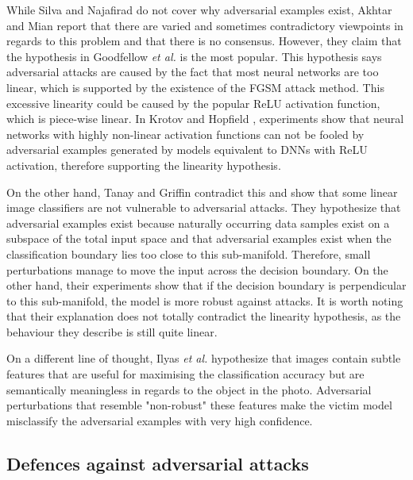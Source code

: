 While Silva and Najafirad \cite{silva_survey} do not cover why adversarial examples exist, Akhtar and Mian \cite{akhtar} report that there are varied and sometimes contradictory viewpoints in regards to this problem and that there is no consensus. However, they claim that the hypothesis in Goodfellow \textit{et al.} \cite{fgsm} is the most popular. This hypothesis says adversarial attacks are caused by the fact that most neural networks are too linear, which is supported by the existence of the FGSM \cite{fgsm} attack method. This excessive linearity could be caused by the popular ReLU activation function, which is piece-wise linear. In Krotov and Hopfield \cite{krotov2018dam}, experiments show that neural networks with highly non-linear activation functions can not be fooled by adversarial examples generated by models equivalent to DNNs with ReLU activation, therefore supporting the linearity hypothesis. 

On the other hand, Tanay and Griffin \cite{tanay2016boundary} contradict this and show that some linear image classifiers are not vulnerable to adversarial attacks. They hypothesize that adversarial examples exist because naturally occurring data samples exist on a subspace of the total input space and that adversarial examples exist when the classification boundary lies too close to this sub-manifold. Therefore, small perturbations manage to move the input across the decision boundary. On the other hand, their experiments show that if the decision boundary is perpendicular to this sub-manifold, the model is more robust against attacks. It is worth noting that their explanation does not totally contradict the linearity hypothesis, as the behaviour they describe is still quite linear.

On a different line of thought, Ilyas \textit{et al.} \cite{adv_examples_bugs} hypothesize that images contain subtle features that are useful for maximising the classification accuracy but are semantically meaningless in regards to the object in the photo. Adversarial perturbations that resemble "non-robust" these features make the victim model misclassify the adversarial examples with very high confidence.

\subsection{Defences against adversarial attacks}

